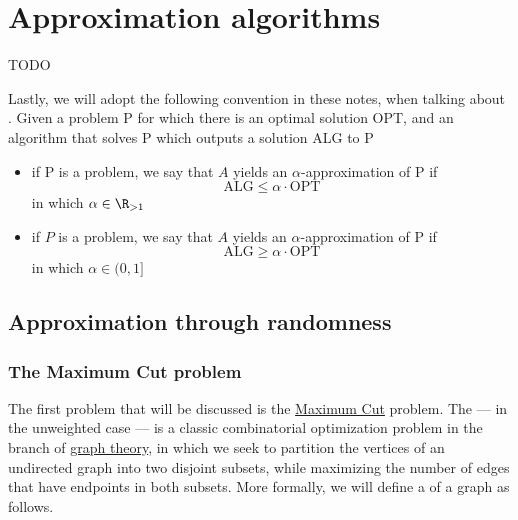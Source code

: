 \documentclass[a4paper, 12pt]{report}
\institute{\curlyquotes{\hspace{0.25mm}Sapienza} Università di Roma}
\subtitle{Appunti integrati con il libro \book}
\author{\textit{Autore}\\\authorName}
\institute{\curlyquotes{\hspace{0.25mm}Sapienza} University of Rome}
\subtitle{Lecture notes integrated with the book \book}
\author{\textit{Author}\\\authorName}
\title{\courseName}
\date{\today}
\begin{document}
    \maketitle

    {
        \hypersetup{allcolors=black}

        \romantableofcontents
    }

    \introduction


    \chapter{Approximation algorithms}

    TODO 

    Lastly, \underline{} we will adopt the following convention in these notes, when talking about . Given a problem P for which there is an optimal solution OPT, and an algorithm that solves P which outputs a solution ALG to P

    \begin{itemize}
        \item if P is a  problem, we say that $A$ yields an $\alpha$-approximation of P if $$\mathrm{ALG} \le \alpha \cdot \mathrm{OPT}$$ in which $\alpha \in \R_{> 1}$
        \item if $P$ is a  problem, we say that $A$ yields an $\alpha$-approximation of P if $$\mathrm{ALG} \ge \alpha \cdot \mathrm{OPT}$$ in which $\alpha \in (0, 1]$
    \end{itemize}

    \section{Approximation through randomness}

    \subsection{The Maximum Cut problem} \label{maxcut}

    The first problem that will be discussed is the \href{https://en.wikipedia.org/wiki/Maximum_cut}{Maximum Cut} problem. The  --- in the unweighted case --- is a classic combinatorial optimization problem in the branch of \href{https://en.wikipedia.org/wiki/Graph_theory}{graph theory}, in which we seek to partition the vertices of an undirected graph into two disjoint subsets, while maximizing the number of edges that have endpoints in both subsets. More formally, we will define a  of a graph as follows.
\end{document}

